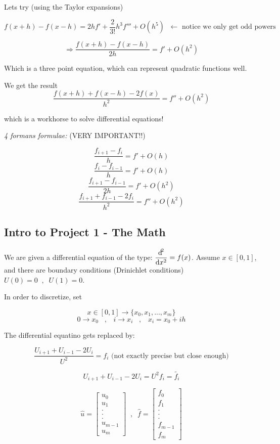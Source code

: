 \documentclass[10pt]{article} %
\begin{document}
\pagebreak

Lets try (using the Taylor expansions)

\[ f(x+h)-f(x-h) = 2hf'+\frac{2}{3!}h^3f'''+O(h^5) \;\; \longleftarrow \text{ notice we only get odd powers} \]

\[ \Rightarrow \dfrac{f(x+h) - f(x-h)}{2h} = f'+O(h^2) \] 

Which is a three point equation, which can represent quadratic functions well.

We get the result \[ \dfrac{f(x+h)+f(x-h)-2f(x)}{h^2} = f''+O(h^2) \]

which is a workhorse to solve differential equations!

\textit{4 formans formulae:} (VERY IMPORTANT!!)

\[ \dfrac{f_{i+1}-f_i}{h} = f'+O(h) \]
\[ \dfrac{f_i-f_{i-1}}{h} = f'+O(h) \]
\[ \dfrac{f_{i+1}-f_{i-1}}{2h} = f'+O(h^2) \]
\[ \dfrac{f_{i+1} + f_{i-1} - 2f_i}{h^2} = f''+O(h^2) \]


\subsection{Intro to Project 1 - The Math}

We are given a differential equation of the type: $\dfrac{\dif^2}{\dif{x^2}} = f(x) $. Assume $ x \in [0,1]$, and there are boundary conditions (Drinichlet conditions) $U(0)=0 \;\; , \;\; U(1)=0$.

In order to discretize, set

\[ x \in [0,1] \longrightarrow \{ x_0,x_1,...,x_m\} \] 
\[ 0 \rightarrow x_0 \;\;\; , \;\;\; i \rightarrow x_i \;\;\; , \;\;\; x_i=x_0+ih \]

The differential equatino gets replaced by: 

\[ \dfrac{U_{i+1}+U_{i-1}-2U_i}{U^2} = f_i \text{ (not exactly precise but close enough)} \]

\[ U_{i+1}+U_{i-1}-2U_i=U^2f_i=\tilde{f_i} \]

\[ \hat{u} = \left[ \begin{array}{c} u_0 \\ u_1 \\ . \\ . \\ . \\ u_{m-1} \\ u_m \end{array} \right] \;\; , \;\; \hat{f} = \left[ \begin{array}{c}  f_0 \\ f_1 \\ . \\ . \\ . \\ f_{m-1} \\ f_m \end{array} \right]  \]
\end{document}
